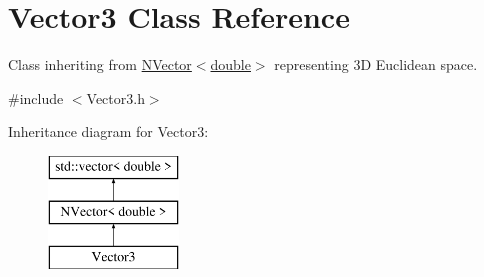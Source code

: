 \hypertarget{class_vector3}{}\section{Vector3 Class Reference}
\label{class_vector3}


Class inheriting from \mbox{\hyperlink{class_n_vector}{N\+Vector$<$double$>$}} representing 3D Euclidean space.  




{\ttfamily \#include $<$Vector3.\+h$>$}

Inheritance diagram for Vector3\+:\begin{figure}[H]
\begin{center}
\leavevmode
\includegraphics[height=3.000000cm]{class_vector3}
\end{center}
\end{figure}
